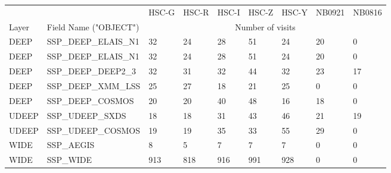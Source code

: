 \begin{tabular}{lllllllll}
& & HSC-G & HSC-R & HSC-I & HSC-Z & HSC-Y & NB0921 & NB0816  \\
Layer & Field Name ("OBJECT") & \multicolumn{7}{c}{Number of visits} \\
DEEP & SSP{\_}DEEP{\_}ELAIS{\_}N1 & 32&24&28&51&24&20&0 \\
DEEP & SSP{\_}DEEP{\_}ELAIS{\_}N1 &32&24&28&51&24&20&0 \\
DEEP & SSP{\_}DEEP{\_}DEEP2{\_}3 &32&31&32&44&32&23&17 \\
DEEP & SSP{\_}DEEP{\_}XMM{\_}LSS &25&27&18&21&25&0&0 \\
DEEP & SSP{\_}DEEP{\_}COSMOS &20&20&40&48&16&18&0 \\
UDEEP&SSP{\_}UDEEP{\_}SXDS&18&18&31&43&46&21&19 \\
UDEEP & SSP{\_}UDEEP{\_}COSMOS&19&19&35&33&55&29&0 \\
WIDE&SSP{\_}AEGIS&8&5&7&7&7&0&0 \\
WIDE & SSP{\_}WIDE&913&818&916&991&928&0&0 \\
\end{tabular}
